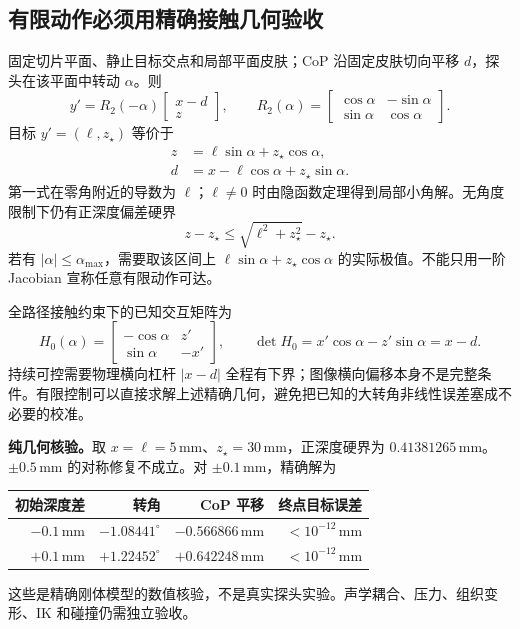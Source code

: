 \documentclass[11pt,a4paper]{article}
\numberwithin{equation}{section}
\theoremstyle{definition}
\begin{document}
\subsection{有限动作必须用精确接触几何验收}
固定切片平面、静止目标交点和局部平面皮肤；CoP 沿固定皮肤切向平移 $d$，探头在该平面中转动 $\alpha$。则
\begin{equation}
 y'=R_2(-\alpha)\begin{bmatrix}x-d\\z\end{bmatrix},\qquad
 R_2(\alpha)=\begin{bmatrix}\cos\alpha&-\sin\alpha\\\sin\alpha&\cos\alpha\end{bmatrix}.
\end{equation}
目标 $y'=(\ell,z_\star)$ 等价于
\begin{align}
 z&=\ell\sin\alpha+z_\star\cos\alpha,\\
 d&=x-\ell\cos\alpha+z_\star\sin\alpha.
\end{align}
第一式在零角附近的导数为 $\ell$；$\ell\ne0$ 时由隐函数定理得到局部小角解。无角度限制下仍有正深度偏差硬界
\begin{equation}
 z-z_\star\le\sqrt{\ell^2+z_\star^2}-z_\star.
\end{equation}
若有 $|\alpha|\le\alpha_{\max}$，需要取该区间上 $\ell\sin\alpha+z_\star\cos\alpha$ 的实际极值。不能只用一阶 Jacobian 宣称任意有限动作可达。

全路径接触约束下的已知交互矩阵为
\begin{equation}
 H_0(\alpha)=\begin{bmatrix}-\cos\alpha&z'\\\sin\alpha&-x'\end{bmatrix},\qquad
 \det H_0=x'\cos\alpha-z'\sin\alpha=x-d.
\end{equation}
持续可控需要物理横向杠杆 $|x-d|$ 全程有下界；图像横向偏移本身不是完整条件。有限控制可以直接求解上述精确几何，避免把已知的大转角非线性误差塞成不必要的校准。

\noindent\textbf{纯几何核验。}取 $x=\ell=5\,\mathrm{mm}$、$z_\star=30\,\mathrm{mm}$，正深度硬界为 $0.41381265\,\mathrm{mm}$。$\pm0.5\,\mathrm{mm}$ 的对称修复不成立。对 $\pm0.1\,\mathrm{mm}$，精确解为
\begin{center}
\begin{tabular}{rrrr}
\toprule
初始深度差 & 转角 & CoP 平移 & 终点目标误差\\
\midrule
$-0.1\,\mathrm{mm}$ & $-1.08441^\circ$ & $-0.566866\,\mathrm{mm}$ & $<10^{-12}\,\mathrm{mm}$\\
$+0.1\,\mathrm{mm}$ & $+1.22452^\circ$ & $+0.642248\,\mathrm{mm}$ & $<10^{-12}\,\mathrm{mm}$\\
\bottomrule
\end{tabular}
\end{center}
这些是精确刚体模型的数值核验，不是真实探头实验。声学耦合、压力、组织变形、IK 和碰撞仍需独立验收。
\end{document}
